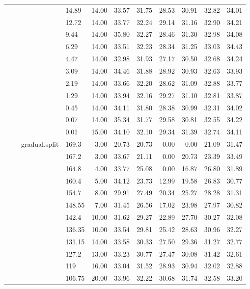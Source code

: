 \begin{longtable}{llllrrrrrrr}
   &  &  & 14.89 & 14.00 & 33.57 & 31.75 & 28.53 & 30.91 & 32.82 & 34.01 \\ 
   &  &  & 12.72 & 14.00 & 33.77 & 32.24 & 29.14 & 31.16 & 32.90 & 34.21 \\ 
   &  &  & 9.44 & 14.00 & 35.80 & 32.27 & 28.46 & 31.30 & 32.98 & 34.08 \\ 
   &  &  & 6.29 & 14.00 & 33.51 & 32.23 & 28.34 & 31.25 & 33.03 & 34.43 \\ 
   &  &  & 4.47 & 14.00 & 32.98 & 31.93 & 27.17 & 30.50 & 32.68 & 34.24 \\ 
   &  &  & 3.09 & 14.00 & 34.46 & 31.88 & 28.92 & 30.93 & 32.63 & 33.93 \\ 
   &  &  & 2.19 & 14.00 & 33.66 & 32.20 & 28.62 & 31.09 & 32.88 & 33.77 \\ 
   &  &  & 1.29 & 14.00 & 33.94 & 32.16 & 29.27 & 31.10 & 32.81 & 33.87 \\ 
   &  &  & 0.45 & 14.00 & 34.11 & 31.80 & 28.38 & 30.99 & 32.31 & 34.02 \\ 
   &  &  & 0.07 & 14.00 & 35.34 & 31.77 & 29.58 & 30.81 & 32.55 & 34.22 \\ 
   &  &  & 0.01 & 15.00 & 34.10 & 32.10 & 29.34 & 31.39 & 32.74 & 34.11 \\ 
   &  & gradual.split & 169.3 & 3.00 & 20.73 & 20.73 & 0.00 & 0.00 & 21.09 & 31.47 \\ 
   &  &  & 167.2 & 3.00 & 33.67 & 21.11 & 0.00 & 20.73 & 23.39 & 33.49 \\ 
   &  &  & 164.8 & 4.00 & 33.77 & 25.08 & 0.00 & 16.87 & 26.80 & 31.89 \\ 
   &  &  & 160.4 & 5.00 & 34.12 & 23.73 & 12.99 & 19.58 & 26.83 & 30.77 \\ 
   &  &  & 154.7 & 8.00 & 29.91 & 27.49 & 20.34 & 25.27 & 28.28 & 31.31 \\ 
   &  &  & 148.55 & 7.00 & 31.45 & 26.56 & 17.02 & 23.98 & 27.97 & 30.82 \\ 
   &  &  & 142.4 & 10.00 & 31.62 & 29.27 & 22.89 & 27.70 & 30.27 & 32.08 \\ 
   &  &  & 136.35 & 10.00 & 33.54 & 29.81 & 25.42 & 28.63 & 30.96 & 32.27 \\ 
   &  &  & 131.15 & 14.00 & 33.58 & 30.33 & 27.50 & 29.36 & 31.27 & 32.77 \\ 
   &  &  & 127.2 & 13.00 & 33.23 & 30.77 & 27.47 & 30.08 & 31.42 & 32.61 \\ 
   &  &  & 119 & 16.00 & 33.04 & 31.52 & 28.93 & 30.94 & 32.02 & 32.88 \\ 
   &  &  & 106.75 & 20.00 & 33.96 & 32.22 & 30.68 & 31.74 & 32.58 & 33.20 \\ 

\end{longtable}
